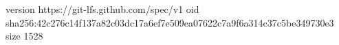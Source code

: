 version https://git-lfs.github.com/spec/v1
oid sha256:42c276c14f137a82c03dc17a6ef7e509ea07622c7a9f6a314c37c5be349730e3
size 1528
